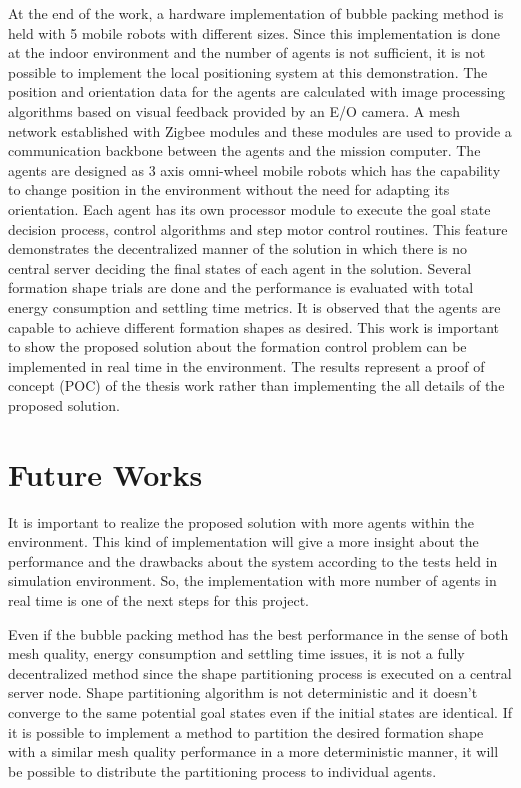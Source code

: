 At the end of the work, a hardware implementation of bubble packing method is held with 5 mobile robots with different sizes. Since this implementation is done at the  indoor environment and the number of agents is not sufficient, it is not possible to implement the local positioning system at this demonstration. The position and orientation data for the agents are calculated with image processing algorithms based on visual feedback provided by an E/O camera. A mesh network established with Zigbee modules and these modules are used to provide a communication backbone between the agents and the mission computer. The agents are designed as 3 axis omni-wheel mobile robots which has the capability to change position in the environment without the need for adapting its orientation. Each agent has its own processor module to execute the goal state decision process, control algorithms and step motor control routines. This feature demonstrates the decentralized manner of the solution in which  there is no central server deciding the final states of each agent in the solution. Several formation shape trials are done and the performance is evaluated with total energy consumption and settling time metrics. It is observed that the agents are capable to achieve different formation shapes as desired. This work is important to show the proposed solution about the formation control problem can be implemented in real time in the environment. The results represent a proof of concept (POC) of the thesis work rather than implementing the all details of the proposed solution.
       
\section{Future Works}
It is important to realize the proposed solution with more agents within the environment. This kind of  implementation will give a more insight about the performance and the drawbacks about the system according to the tests held in simulation environment. So, the implementation with more number of agents in real time is one of the next steps for this project.
		
Even if the bubble packing method has the best performance in the sense of both mesh quality, energy consumption and settling time issues, it is not a fully decentralized method since the shape partitioning process is executed on a central server node. Shape partitioning algorithm is not deterministic and it doesn't converge to the same potential goal states even if the initial states are identical. If it is possible to implement a method to partition the desired formation shape with a similar mesh quality performance in a more deterministic manner, it will be possible to distribute the partitioning process to individual agents. 
    
